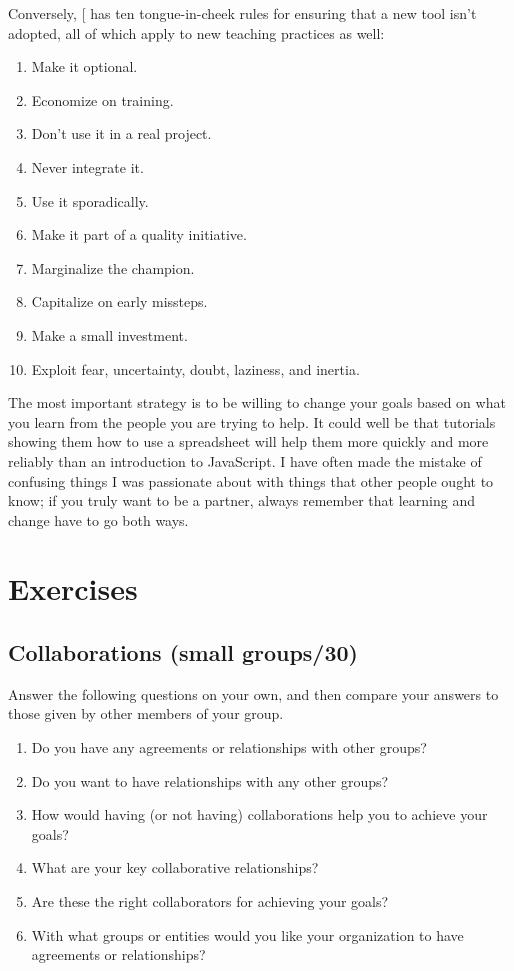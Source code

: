 Conversely, {[}\protect[\hyperlink{b:Farm2006}{Farm2006}]{]} has ten tongue-in-cheek rules for
ensuring that a new tool isn't adopted, all of which apply to new
teaching practices as well:

\begin{enumerate}
\item
  Make it optional.
\item
  Economize on training.
\item
  Don't use it in a real project.
\item
  Never integrate it.
\item
  Use it sporadically.
\item
  Make it part of a quality initiative.
\item
  Marginalize the champion.
\item
  Capitalize on early missteps.
\item
  Make a small investment.
\item
  Exploit fear, uncertainty, doubt, laziness, and inertia.
\end{enumerate}

The most important strategy is to be willing to change your goals based
on what you learn from the people you are trying to help. It could well
be that tutorials showing them how to use a spreadsheet will help them
more quickly and more reliably than an introduction to JavaScript. I
have often made the mistake of confusing things I was passionate about
with things that other people ought to know; if you truly want to be a
partner, always remember that learning and change have to go both ways.

\section{Exercises}\label{s:partner-exercises}

\subsection{Collaborations (small groups/30)}\label{collaborations-small-groups30}

Answer the following questions on your own, and then compare your
answers to those given by other members of your group.

\begin{enumerate}
\item
  Do you have any agreements or relationships with other groups?
\item
  Do you want to have relationships with any other groups?
\item
  How would having (or not having) collaborations help you to achieve
  your goals?
\item
  What are your key collaborative relationships?
\item
  Are these the right collaborators for achieving your goals?
\item
  With what groups or entities would you like your organization to
  have agreements or relationships?
\end{enumerate}

